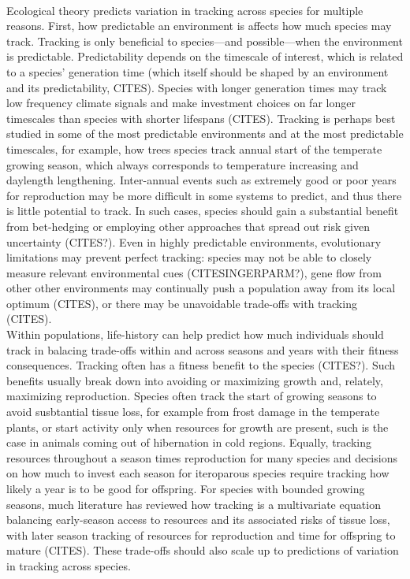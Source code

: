 \documentclass[11pt,letterpaper]{article}
\begin{document}
\\
Ecological theory predicts variation in tracking across species for multiple reasons. First, how predictable an environment is affects how much species may track. Tracking is only beneficial to species---and possible---when the environment is predictable. Predictability depends on the timescale of interest, which is related to a species' generation time (which itself should be shaped by an environment and its predictability, CITES). Species with longer generation times may track low frequency climate signals and make investment choices on far longer timescales than species with shorter lifespans (CITES). Tracking is perhaps best studied in some of the most predictable environments and at the most predictable timescales, for example, how trees species track annual start of the temperate growing season, which always corresponds to temperature increasing and daylength lengthening. Inter-annual events such as extremely good or poor years for reproduction may be more difficult in some systems to predict, and thus there is little potential to track. In such cases, species should gain a substantial benefit from bet-hedging or employing other approaches that spread out risk given uncertainty (CITES?). Even in highly predictable environments, evolutionary limitations may prevent perfect tracking: species may not be able to closely measure relevant environmental cues (CITESINGERPARM?), gene flow from other other environments may continually push a population away from its local optimum (CITES), or there may be unavoidable trade-offs with tracking (CITES). 
\\
Within populations, life-history can help predict how much individuals should track in balacing trade-offs within and across seasons and years with their fitness consequences. Tracking often has a fitness benefit to the species (CITES?). Such benefits usually break down into avoiding or maximizing growth and, relately, maximizing reproduction. Species often track the start of growing seasons to avoid susbtantial tissue loss, for example from frost damage in the temperate plants, or start activity only when resources for growth are present, such is the case in animals coming out of hibernation in cold regions. Equally, tracking resources throughout a season times reproduction for many species and decisions on how much to invest each season for iteroparous species require tracking how likely a year is to be good for offspring. For species with bounded growing seasons, much literature has reviewed how tracking is a multivariate equation balancing early-season access to resources and its associated risks of tissue loss, with later season tracking of resources for reproduction and time for offspring to mature (CITES). These trade-offs should also scale up to predictions of variation in tracking across species. 
\end{document}
